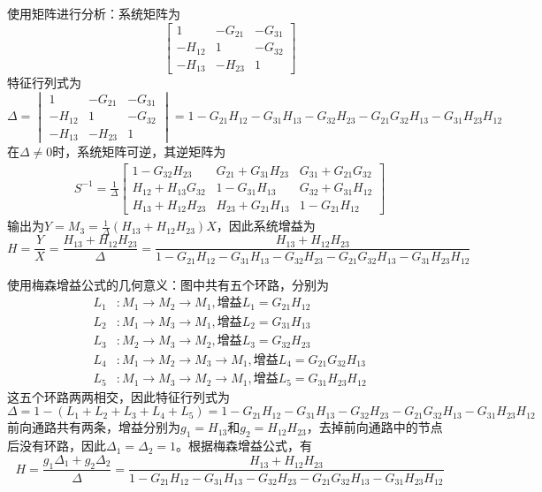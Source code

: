 \documentclass{ctexbook}
\begin{document}
\begin{example}[单入单出信号流图]
\begin{figure}[H]
    \end{figure}
    使用矩阵进行分析：系统矩阵为
    \[\begin{bmatrix}
        1 & -G_{21} & -G_{31} \\
        -H_{12} & 1 & -G_{32} \\
        -H_{13} & -H_{23} & 1
    \end{bmatrix}\]
    特征行列式为
    $$\Delta=\begin{vmatrix}
        1 & -G_{21} & -G_{31} \\
        -H_{12} & 1 & -G_{32} \\
        -H_{13} & -H_{23} & 1
    \end{vmatrix}=1-G_{21}H_{12}-G_{31}H_{13}-G_{32}H_{23}-G_{21}G_{32}H_{13}-G_{31}H_{23}H_{12}$$
    在$\Delta\neq 0$时，系统矩阵可逆，其逆矩阵为\begin{align*}
        S^{-1}=\frac{1}{\Delta}\begin{bmatrix}
            1-G_{32}H_{23} & G_{21}+G_{31}H_{23} & G_{31}+G_{21}G_{32} \\
            H_{12}+H_{13}G_{32} & 1-G_{31}H_{13} & G_{32}+G_{31}H_{12} \\
            H_{13}+H_{12}H_{23} & H_{23}+G_{21}H_{13} & 1-G_{21}H_{12}
        \end{bmatrix}
    \end{align*}
    输出为$Y=M_3=\frac{1}{\Delta}(H_{13}+H_{12}H_{23})X$，因此系统增益为
    \[H=\frac{Y}{X}=\frac{H_{13}+H_{12}H_{23}}{\Delta}=\frac{H_{13}+H_{12}H_{23}}{1-G_{21}H_{12}-G_{31}H_{13}-G_{32}H_{23}-G_{21}G_{32}H_{13}-G_{31}H_{23}H_{12}}\]

    使用梅森增益公式的几何意义：图中共有五个环路，分别为\begin{align*}
        L_1&:M_1\to M_2\to M_1,\text{增益}L_1=G_{21}H_{12}\\
        L_2&:M_1\to M_3\to M_1,\text{增益}L_2=G_{31}H_{13}\\
        L_3&:M_2\to M_3\to M_2,\text{增益}L_3=G_{32}H_{23}\\
        L_4&:M_1\to M_2\to M_3\to M_1,\text{增益}L_4=G_{21}G_{32}H_{13}\\
        L_5&:M_1\to M_3\to M_2\to M_1,\text{增益}L_5=G_{31}H_{23}H_{12}
    \end{align*}
    这五个环路两两相交，因此特征行列式为
    \[\Delta=1-(L_1+L_2+L_3+L_4+L_5)=1-G_{21}H_{12}-G_{31}H_{13}-G_{32}H_{23}-G_{21}G_{32}H_{13}-G_{31}H_{23}H_{12}\]
    前向通路共有两条，增益分别为$g_1=H_{13}$和$g_2=H_{12}H_{23}$，去掉前向通路中的节点后没有环路，因此$\Delta_1=\Delta_2=1$。根据梅森增益公式，有
    \[H=\frac{g_1\Delta_1+g_2\Delta_2}{\Delta}=\frac{H_{13}+H_{12}H_{23}}{1-G_{21}H_{12}-G_{31}H_{13}-G_{32}H_{23}-G_{21}G_{32}H_{13}-G_{31}H_{23}H_{12}}\]
\end{example}
\end{document}
